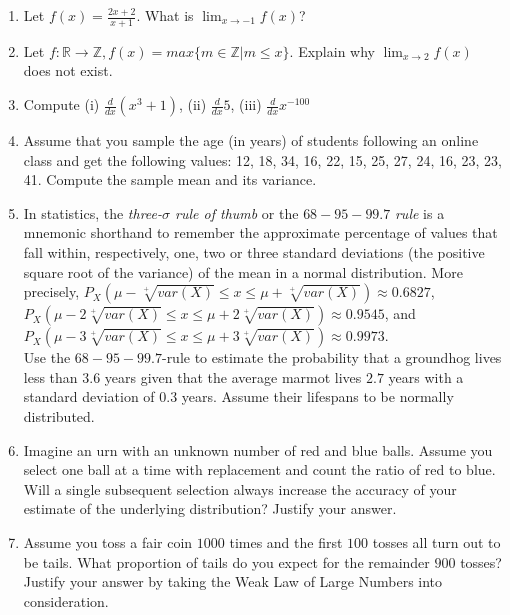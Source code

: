 \documentclass{article}
\begin{document}
\begin{enumerate}
	\item Let $f(x) = \frac{2x + 2}{x + 1}$. What is $\lim_{x \to -1} f(x)$?
	\item Let $f: \mathbb{R} \to \mathbb{Z}, f(x) = max\{m \in \mathbb{Z} | m \leq x\}$. Explain why $\lim_{x \to 2} f(x)$ does not exist. 
	\item Compute (i) $\frac{d}{dx}(x^3 + 1)$, (ii) $\frac{d}{dx}5$, (iii) $\frac{d}{dx} x^{-100}$
	\item Assume that you sample the age (in years) of students following an online class and get the following values: 12, 18, 34, 16, 22, 15, 25, 27, 24, 16, 23, 23, 41. Compute the sample mean and its variance.
	\item In statistics, the {\em three-$\sigma$ rule of thumb} or the $68-95-99.7$ {\em rule} is a mnemonic shorthand to remember the approximate percentage of values that fall within, respectively, one, two or three standard deviations (the positive square root of the variance) of the mean in a normal distribution. More precisely, $P_X(\mu - \sqrt[+]{var(X)} \leq x \leq \mu + \sqrt[+]{var(X)}) \approx 0.6827$,  $P_X(\mu - 2\sqrt[+]{var(X)} \leq x \leq \mu + 2\sqrt[+]{var(X)}) \approx 0.9545$, and $P_X(\mu - 3\sqrt[+]{var(X)} \leq x \leq \mu + 3\sqrt[+]{var(X)}) \approx 0.9973$.\\ Use the $68-95-99.7$-rule to estimate the probability that a groundhog lives less than $3.6$ years given that the average marmot lives $2.7$ years with a standard deviation of $0.3$ years. Assume their lifespans to be normally distributed.
	\item Imagine an urn with an unknown number of red and blue balls. Assume you select one ball at a time with replacement and count the ratio of red to blue. Will a single subsequent selection always increase the accuracy of your estimate of the underlying distribution? Justify your answer.  
	\item Assume you toss a fair coin $1000$ times and the first $100$ tosses all turn out to be tails. What proportion of tails do you expect for the remainder $900$ tosses? Justify your answer by taking the Weak Law of Large Numbers into consideration. 
\end{enumerate}		
\end{document}
